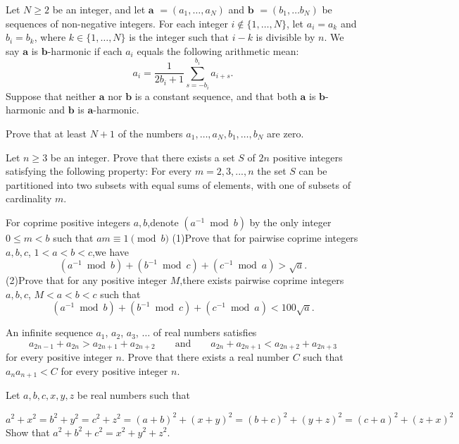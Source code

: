 \documentclass[11pt]{scrartcl}
\begin{document}
\begin{problem}[8059299736482475200]
Let $N \geq 2$ be an integer, and let $\mathbf a$ $= (a_1, \ldots, a_N)$ and $\mathbf b$ $= (b_1, \ldots b_N)$ be sequences of non-negative integers. For each integer $i \not \in \{1, \ldots, N\}$, let $a_i = a_k$ and $b_i = b_k$, where $k \in \{1, \ldots, N\}$ is the integer such that $i-k$ is divisible by $n$. We say $\mathbf a$ is $\mathbf b$-harmonic if each $a_i$ equals the following arithmetic mean:\[a_i = \frac{1}{2b_i+1} \sum_{s=-b_i}^{b_i} a_{i+s}.\]Suppose that neither $\mathbf a $ nor $\mathbf b$ is a constant sequence, and that both $\mathbf a$ is $\mathbf b$-harmonic and $\mathbf b$ is $\mathbf a$-harmonic.

Prove that at least $N+1$ of the numbers $a_1, \ldots, a_N,b_1, \ldots, b_N$ are zero.
\end{problem}
\begin{problem}[8059760967121829853]
	Let $n\geqslant 3$ be an integer. Prove that there exists a set $S$ of $2n$ positive integers satisfying the following property: For every $m=2,3,...,n$ the set $S$ can be partitioned into two subsets with equal sums of elements, with one of subsets of cardinality $m$.
\end{problem}
\begin{problem}[8092459585001113885]
For coprime positive integers $a,b$,denote $(a^{-1}\bmod{b})$ by the only integer $0\leq m<b$ such that $am\equiv 1\pmod{b}$
(1)Prove that for pairwise coprime integers $a,b,c$, $1<a<b<c$,we have\[(a^{-1}\bmod{b})+(b^{-1}\bmod{c})+(c^{-1}\bmod{a})>\sqrt a.\](2)Prove that for any positive integer $M$,there exists pairwise coprime integers $a,b,c$, $M<a<b<c$ such that
\[(a^{-1}\bmod{b})+(b^{-1}\bmod{c})+(c^{-1}\bmod{a})< 100\sqrt a.\]
\end{problem}
\begin{problem}[8126547357118301633]
An infinite sequence $a_1$, $a_2$, $a_3$, $\ldots$ of real numbers satisfies
\[
a_{2n-1} + a_{2n} > a_{2n+1} + a_{2n+2} \qquad \mbox{and} \qquad a_{2n} + a_{2n+1} < a_{2n+2} + a_{2n+3}
\]for every positive integer $n$. Prove that there exists a real number $C$ such that $a_{n} a_{n+1} < C$ for every positive integer $n$.
\end{problem}
\begin{problem}[8129091008921005997]
Let $a,b,c,x,y,z$ be real numbers such that

\[ a^2+x^2=b^2+y^2=c^2+z^2=(a+b)^2+(x+y)^2=(b+c)^2+(y+z)^2=(c+a)^2+(z+x)^2 \]
Show that $a^2+b^2+c^2=x^2+y^2+z^2$.
\end{problem}
\end{document}

